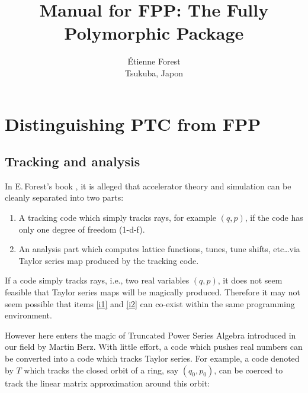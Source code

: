 \documentclass[english,12pt,article]{article} %
\title{ \protect \large Manual for FPP:   The Fully Polymorphic Package}
\author{Étienne Forest \\ Tsukuba, Japon }
\begin{document}
 
\maketitle

\newpage 
{\footnotesize
\tableofcontents %
}
\newpage 

\section{Distinguishing PTC from FPP}\label{sec:fppptc}

 \subsection{Tracking and analysis }\label{sub:ta}
 
 In E.\,Forest's book \cite{thebook}, it is alleged that accelerator theory and simulation can be cleanly separated into two parts:
 
 \begin{enumerate}
 \item\label{i1} A tracking code which simply tracks rays, for example  $(q,p)$,  if the code has only one degree of freedom (1-d-f). 
 \item\label{i2}  An analysis part which computes lattice functions, tunes, tune shifts, etc\dots via Taylor series map produced by the tracking code. 
 \end{enumerate}
 
 If a code simply tracks rays, i.e., two real variables  $(q,p)$,  it does not seem feasible that Taylor series maps will be magically produced. Therefore it may not seem possible that items \ref{i1} and \ref{i2} can co-exist within the same programming environment.
 
 
 However here enters the magic of Truncated Power Series Algebra introduced in our field by Martin Berz\cite{tpsa}. With little effort, a code which pushes real numbers can be converted into a code which tracks Taylor series. For example, a code denoted by $T$ which tracks the closed orbit of a ring, say  $(q_0,p_0)$, can be coerced to track the linear matrix approximation around this orbit:
 
\end{document}
